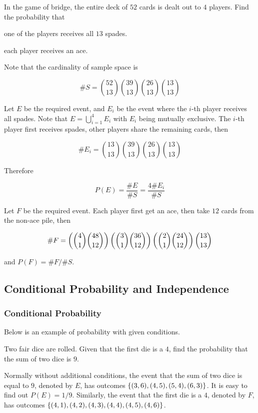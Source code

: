 \documentclass[a4paper,12pt]{article}
\begin{document}
\begin{exm}
  In the game of bridge, the entire deck of $52$ cards is dealt out to $4$ players. Find the probability that

  \begin{alist}
    \item one of the players receives all $13$ spades.
    \item each player receives an ace.
  \end{alist}

  \ans{} Note that the cardinality of sample space is
  
  $$\#S=\binom{52}{13}\binom{39}{13}\binom{26}{13}\binom{13}{13}$$

  Let $E$ be the required event, and $E_{i}$ be the event where the $i$-th player receives all spades. Note that $E=\bigcup_{i=1}^{4}E_{i}$ with $E_{i}$ being mutually exclusive. The $i$-th player first receives spades, other players share the remaining cards, then

  $$\#E_{i}=\binom{13}{13}\binom{39}{13}\binom{26}{13}\binom{13}{13}$$\s

  Therefore

  $$P(E)=\frac{\#E}{\#S}=\frac{4\#E_{i}}{\#S}$$

   Let $F$ be the required event. Each player first get an ace, then take $12$ cards from the non-ace pile, then

  $$\#F=\left( \binom{4}{1}\binom{48}{12}\right)\left( \binom{3}{1}\binom{36}{12}\right)\left( \binom{2}{1}\binom{24}{12}\right)\binom{13}{13}$$\s

  and $P(F)=\#F/\#S$.
\end{exm}

\subsection{Conditional Probability and Independence}
\subsubsection{Conditional Probability}
Below is an example of probability with given conditions.\n

\begin{exm}
  Two fair dice are rolled. Given that the first die is a $4$, find the probability that the sum of two dice is $9$.
\end{exm}\n

Normally without additional conditions, the event that the sum of two dice is equal to $9$, denoted by $E$, has outcomes $\left\{ (3,6),(4,5),(5,4),(6,3)\right\}$. It is easy to find out $P(E)=1/9$. Similarly, the event that the first die is a $4$, denoted by $F$, has outcomes $\left\{ (4,1),(4,2),(4,3),(4,4),(4,5),(4,6)\right\}$.\n
\end{document}
